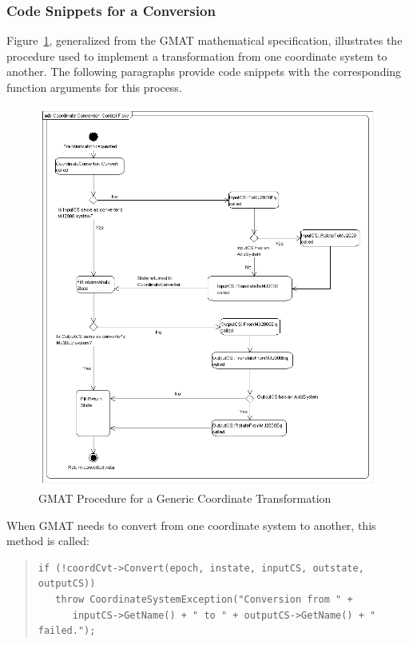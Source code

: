 \subsubsection{Code Snippets for a Conversion}

Figure~\ref{figure:TransformDetails}, generalized from the GMAT mathematical
specification, illustrates the procedure used to implement a transformation
from one coordinate system to another. The following paragraphs provide
code snippets with the corresponding function arguments for this process.

\begin{figure}
\begin{center}
\includegraphics[401,450]{Images/CoordinateConversionControlFlow.png}
\caption{\label{figure:TransformDetails}GMAT Procedure for a Generic Coordinate Transformation}
\end{center}
\end{figure}

When GMAT needs to convert from one coordinate system to another, this method is called:

\begin{quotation}
\begin{verbatim}
if (!coordCvt->Convert(epoch, instate, inputCS, outstate, outputCS))
   throw CoordinateSystemException("Conversion from " +
      inputCS->GetName() + " to " + outputCS->GetName() + " failed.");
\end{verbatim}
\end{quotation}

